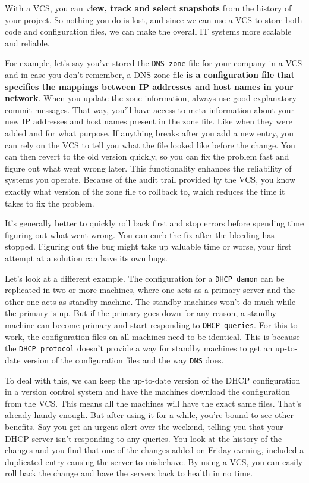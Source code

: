 	With a VCS, you can v\textbf{iew, track and select snapshots} from the history of your project. So nothing you do is lost, and since we can use a VCS to store both code and configuration files, we can make the overall IT systems more scalable and reliable. 
	
	For example, let's say you've stored the \texttt{DNS zone} file for your company in a VCS and in case you don't remember, a DNS zone file\texttt{} \textbf{is a configuration file that specifies the mappings between IP addresses and host names in your network}. When you update the zone information, always use good explanatory commit messages. That way, you'll have access to meta information about your new IP addresses and host names present in the zone file. Like when they were added and for what purpose. 
	If anything breaks after you add a new entry, you can rely on the VCS to tell you what the file looked like before the change. You can then revert to the old version quickly, so you can fix the problem fast and figure out what went wrong later. This functionality enhances the reliability of systems you operate. Because of the audit trail provided by the VCS, you know exactly what version of the zone file to rollback to, which reduces the time it takes to fix the problem. 
	
	It's generally better to quickly roll back first and stop errors before spending time figuring out what went wrong. You can curb the fix after the bleeding has stopped. Figuring out the bug might take up valuable time or worse, your first attempt at a solution can have its own bugs. 
	
	Let's look at a different example. The configuration for a \texttt{DHCP damon} can be replicated in two or more machines, where one acts as a primary server and the other one acts as standby machine. The standby machines won't do much while the primary is up. But if the primary goes down for any reason, a standby machine can become primary and start responding to \texttt{DHCP queries}. For this to work, the configuration files on all machines need to be identical. This is because the \texttt{DHCP protocol} doesn't provide a way for standby machines to get an up-to-date version of the configuration files and the way \texttt{DNS} does. 
	
	To deal with this, we can keep the up-to-date version of the DHCP configuration in a version control system and have the machines download the configuration from the VCS. This means all the machines will have the exact same files. That's already handy enough. But after using it for a while, you're bound to see other benefits. Say you get an urgent alert over the weekend, telling you that your DHCP server isn't responding to any queries. You look at the history of the changes and you find that one of the changes added on Friday evening, included a duplicated entry causing the server to misbehave. By using a VCS, you can easily roll back the change and have the servers back to health in no time. 
	
